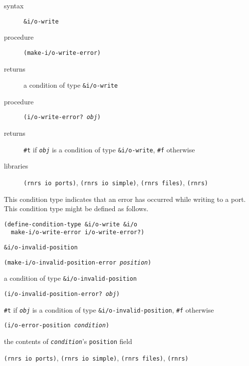 \begin{description}

\label{exceptions_s34}\item[syntax] \texttt{\&{}i/o-write}



\item[procedure] \texttt{(make-i/o-write-error)}



\item[returns] a condition of type \texttt{\&{}i/o-write}


\item[procedure] \texttt{(i/o-write-error? \textit{obj})}



\item[returns] \texttt{\#{}t} if \texttt{\textit{obj}} is a condition of type \texttt{\&{}i/o-write}, \texttt{\#{}f} otherwise


\item[libraries] \texttt{(rnrs io ports)}, \texttt{(rnrs io simple)}, \texttt{(rnrs files)}, \texttt{(rnrs)}
\end{description}



This condition type indicates that an error has occurred while writing
to a port.
This condition type might be defined as follows.

\begin{alltt}
(define-condition-type \&{}i/o-write \&{}i/o
  make-i/o-write-error i/o-write-error?)
\end{alltt}

\begin{description}

\label{exceptions_s35}\item[syntax] \texttt{\&{}i/o-invalid-position}



\item[procedure] \texttt{(make-i/o-invalid-position-error \textit{position})}



\item[returns] a condition of type \texttt{\&{}i/o-invalid-position}


\item[procedure] \texttt{(i/o-invalid-position-error? \textit{obj})}



\item[returns] \texttt{\#{}t} if \texttt{\textit{obj}} is a condition of type \texttt{\&{}i/o-invalid-position}, \texttt{\#{}f} otherwise


\item[procedure] \texttt{(i/o-error-position \textit{condition})}



\item[returns] the contents of \texttt{\textit{condition}}'s \texttt{position} field


\item[libraries] \texttt{(rnrs io ports)}, \texttt{(rnrs io simple)}, \texttt{(rnrs files)}, \texttt{(rnrs)}
\end{description}



